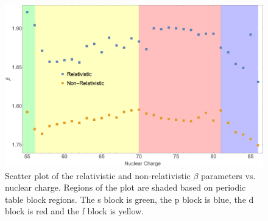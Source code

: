 \begin{figure}
\center
\includegraphics[width=1\textwidth]{Figures/BS_rel_beta.png}
\caption[Scatter plot of the relativistic and non-relativistic $\beta$ parameters vs. nuclear charge.]
{Scatter plot of the relativistic and non-relativistic $\beta$ parameters vs. nuclear charge. Regions of the plot are shaded based on periodic table block regions. The s block is green, the p block is blue, the d block is red and the f block is yellow.}
\label{fig:BS_rel_beta}
\end{figure}

